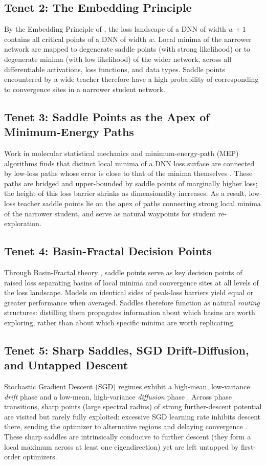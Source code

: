 \documentclass[letterpaper]{article}
\begin{document}
\subsection{Tenet 2: The Embedding Principle}
By the Embedding Principle of \citet{zhang2021embedding}, the loss landscape of a DNN of width $w+1$ contains all critical points of a DNN of width $w$. Local minima of the narrower network are mapped to degenerate saddle points (with strong likelihood) or to degenerate minima (with low likelihood) of the wider network, across all differentiable activations, loss functions, and data types. Saddle points encountered by a wide teacher therefore have a high probability of corresponding to convergence sites in a narrower student network.

\subsection{Tenet 3: Saddle Points as the Apex of Minimum-Energy Paths}
Work in molecular statistical mechanics and minimum-energy-path (MEP) algorithms finds that distinct local minima of a DNN loss surface are connected by low-loss paths whose error is close to that of the minima themselves \citep{reddy2006stability, draxler2018barriers}. These paths are bridged and upper-bounded by saddle points of marginally higher loss; the height of this loss barrier shrinks as dimensionality increases. As a result, low-loss teacher saddle points lie on the apex of paths connecting strong local minima of the narrower student, and serve as natural waypoints for student re-exploration.

\subsection{Tenet 4: Basin-Fractal Decision Points}
Through Basin-Fractal theory \citep{liao2017theory}, saddle points serve as key decision points of raised loss separating basins of local minima and convergence sites at all levels of the loss landscape. Models on identical sides of peak-loss barriers yield equal or greater performance when averaged. Saddles therefore function as natural \emph{routing} structures: distilling them propagates information about which basins are worth exploring, rather than about which specific minima are worth replicating.

\subsection{Tenet 5: Sharp Saddles, SGD Drift-Diffusion, and Untapped Descent}
Stochastic Gradient Descent (SGD) regimes exhibit a high-mean, low-variance \emph{drift} phase and a low-mean, high-variance \emph{diffusion} phase \citep{jastrzebski2019relation}. Across phase transitions, sharp points (large spectral radius) of strong further-descent potential are visited but rarely fully exploited: excessive SGD learning rate inhibits descent there, sending the optimizer to alternative regions and delaying convergence \citep{jastrzebski2019relation, alain2019negative}. These sharp saddles are intrinsically conducive to further descent (they form a local maximum across at least one eigendirection) yet are left untapped by first-order optimizers.
\end{document}
